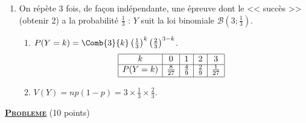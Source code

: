 \begin{enumerate}
\begin{enumerate}
\begin{itemize}
						(ce qui est bien le double de l'espérance d'un lancer : $\frac{1+2+2+3+4+6}{6} = 3$).
				\end{itemize}
				\item On répète $3$ fois, de façon indépendante, une épreuve dont le << succès >> (obtenir 2) a la probabilité $\frac{1}{3}$ :
					$Y$ suit la loi binomiale $\mathscr{B}\left(3;\frac{1}{3}\right)$.
					\begin{enumerate}
						\item {} $P(Y = k) = \Comb{3}{k}\left(\frac{1}{3}\right)^k\left(\frac{2}{3}\right)^{3-k}$.
							\[
							\begin{array}{|c|c|c|c|c|}
								\hline
								k & 0 & 1 & 2 & 3 \\ \hline
								P(Y=k) & \frac{8}{27} & \frac{4}{9} & \frac{2}{9} & \frac{1}{27} \\[.5ex] \hline
							\end{array}
							\]
						\item {} $V(Y) = np(1-p) = 3\times\frac{1}{3}\times\frac{2}{3}$.

					\end{enumerate}
			\end{enumerate}
	\end{enumerate}
\noindent \underline{\textsc{\textbf{Probleme}}} (10 points)
